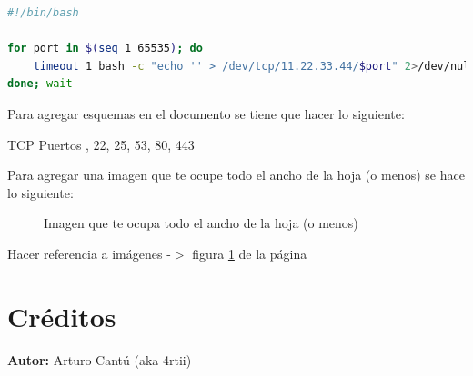 \documentclass[a4paper]{article} %
\begin{document}
    \vspace{0.3cm}
        
    \begin{lstlisting}[language=Bash, caption=Script personalizado para ...]
#!/bin/bash
            
for port in $(seq 1 65535); do
    timeout 1 bash -c "echo '' > /dev/tcp/11.22.33.44/$port" 2>/dev/null && echo "Port $port - Open" &
done; wait
    \end{lstlisting}
        
    \vspace{0.3cm}
        
    Para agregar esquemas en el documento se tiene que hacer lo siguiente:
        
    \begin{schema}{TCP}
        Puertos
        , 22, 25, 53, 80, 443
    \end{schema}
        
    \vspace{0.3cm}
        
    Para agregar una imagen que te ocupe todo el ancho de la hoja (o menos) se hace lo siguiente:
    \begin{figure}[h]
        \centering
        \caption{Imagen que te ocupa todo el ancho de la hoja (o menos)}
        \label{fig:test}
    \end{figure}
        
    \vspace{0.3cm}
        
    Hacer referencia a imágenes -$>$ figura \ref{fig:test} de la página \pageref{fig:test}
        
    \clearpage
    
    \section{Créditos}
        \textbf{Autor:} Arturo Cantú (aka 4rtii)
        
\end{document}

